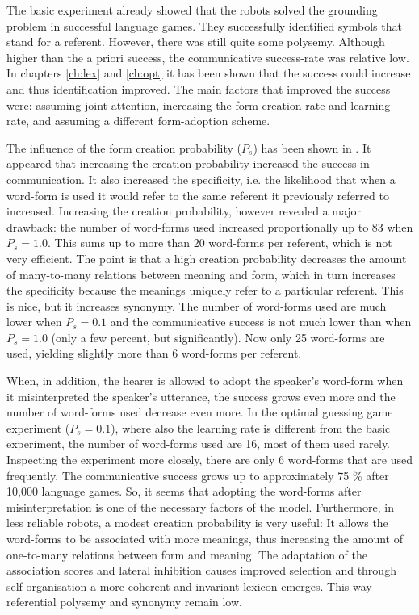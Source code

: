 The basic experiment already showed that the robots solved the grounding problem in successful language games. They successfully identified symbols that stand for a referent. However, there was still quite some polysemy. Although higher than the a priori success, the communicative success-rate was relative low. In chapters \ref{ch:lex} and \ref{ch:opt} it has been shown that the success could increase and thus identification improved. The main factors that improved the success were: assuming joint attention, increasing the form creation rate and learning rate, and assuming a different form-adoption scheme.

The influence of the form creation probability ($P_s$) has been shown in . It appeared that increasing the creation probability increased the success in communication. It also increased the specificity, i.e. the likelihood that when a word-form is used it would refer to the same referent it previously referred to increased. Increasing the creation probability, however revealed a major drawback: the number of word-forms used increased proportionally up to 83 when $P_s=1.0$. This sums up to more than 20 word-forms per referent, which is not very efficient. The point is that a high creation probability decreases the amount of many-to-many relations between meaning and form, which in turn increases the specificity because the meanings uniquely refer to a particular referent. This is nice, but it increases synonymy. The number of word-forms used are much lower when $P_s=0.1$ and the communicative success is not much lower than when $P_s=1.0$ (only a few percent, but significantly). Now only 25 word-forms are used, yielding slightly more than 6 word-forms per referent. 

When, in addition, the hearer is allowed to adopt the speaker's word-form when it misinterpreted the speaker's utterance, the success grows even more and the number of word-forms used decrease even more. In the optimal guessing game experiment ($P_s=0.1$), where also the learning rate is different from the basic experiment, the number of word-forms used are 16, most of them used rarely. Inspecting the experiment more closely, there are only 6 word-forms that are used frequently. The communicative success grows up to approximately 75 \% after 10,000 language games. So, it seems that adopting the word-forms after misinterpretation is one of the necessary factors of the model. Furthermore, in less reliable robots, a modest creation probability is very useful: It allows the word-forms to be associated with more meanings, thus increasing the amount of one-to-many relations between form and meaning. The adaptation of the association scores and lateral inhibition causes improved selection and through self-organisation a more coherent and invariant lexicon emerges. This way referential polysemy and synonymy remain low.

